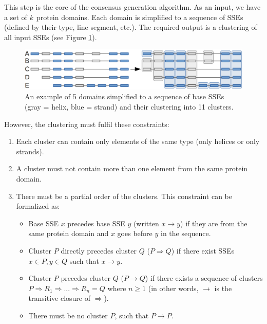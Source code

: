 \documentclass{article}
\begin{document}
This step is the core of the consensus generation algorithm. As an input, we
have a set of \emph{k}~protein domains. Each domain is simplified to a
sequence of SSEs (defined by their type, line segment, etc.). 
The required output is a clustering of all input SSEs (see Figure \ref{fig:clusters}).

\begin{figure}[h!]
  \centering\includegraphics[width=\linewidth]{figures/clusters.png}
  \caption{An example of 5 domains simplified to a sequence of base SSEs 
  (gray = helix, blue = strand) and their clustering into 11 clusters.}
  \label{fig:clusters}
\end{figure}

However, the clustering must fulfil these constraints:

\begin{enumerate}
\def\labelenumi{\arabic{enumi}.}
\item
  Each cluster can contain only elements of the same type (only helices
  or only strands).
\item
  A cluster must not contain more than one element from the same protein
  domain.
\item
  There must be a partial order of the clusters. This constraint can be formalized as:
  \begin{itemize}
    \item
      Base SSE \(x\) precedes base SSE \(y\) (written \(x \rightarrow y\)) if they
      are from the same protein domain and \(x\) goes before \(y\) in the sequence.
    \item
      Cluster \(P\) directly precedes cluster \(Q\) (\(P \Rightarrow Q\)) if there
      exist SSEs \(x \in P, y \in Q\) such that \(x \rightarrow y\).
    \item
      Cluster \(P\) precedes cluster \(Q\) (\(P \rightarrow Q\)) if there
      exists a sequence of clusters \(P \Rightarrow R_1 \Rightarrow ... 
      \Rightarrow R_n = Q\) where \(n \geq 1\) (in other words, \(\rightarrow\) 
      is the transitive closure of \(\Rightarrow\)).
    \item
      There must be no cluster \(P\), such that \(P \rightarrow P\).
  \end{itemize}
\end{enumerate}
\end{document}
